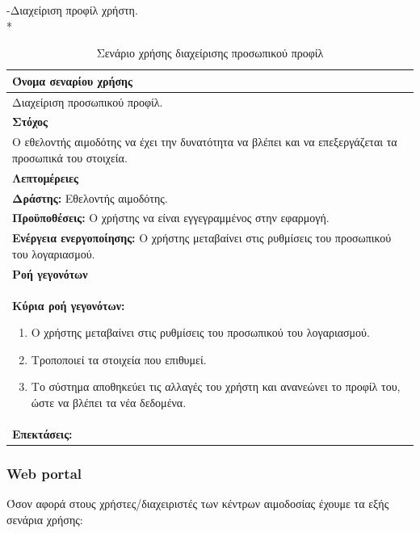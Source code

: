 -Διαχείριση προφίλ χρήστη.
\\*
\begin{table}[H]
	\begin{center}
	    \begin{tabular}{|p{\dimexpr \linewidth-2\tabcolsep}|}
	    \hline
	    \rowcolor{grayy}
	    \textbf{Όνομα σεναρίου χρήσης}
	    \\ \hline    
	    Διαχείριση προσωπικού προφίλ. 
	     \\ \hline
	    \rowcolor{grayy}
	    \textbf{\textbf{Στόχος}}
	    \\ \hline
	 	 Ο εθελοντής αιμοδότης να έχει την δυνατότητα να βλέπει και να επεξεργάζεται τα προσωπικά του στοιχεία.
	    \\ \hline
	    \rowcolor{grayy}
	    \textbf{Λεπτομέρειες}
	    \\ \hline
		\textbf{Δράστης:} Εθελοντής αιμοδότης.
		\\*
		\textbf{Προϋποθέσεις:} Ο χρήστης να είναι εγγεγραμμένος στην εφαρμογή.
		\\*
		\textbf{Ενέργεια ενεργοποίησης:} Ο χρήστης μεταβαίνει στις ρυθμίσεις του προσωπικού του λογαριασμού.
		\\ \hline
		\rowcolor{grayy}    
	    \textbf{Ροή γεγονότων}
	    \\ \hline
		\textbf{Κύρια ροή γεγονότων:}
		\begin{enumerate}
			\item	 Ο χρήστης μεταβαίνει στις ρυθμίσεις του προσωπικού του λογαριασμού.
			\item Τροποποιεί τα στοιχεία που επιθυμεί.
			\item Το σύστημα αποθηκεύει τις αλλαγές του χρήστη και ανανεώνει το προφίλ του, ώστε να βλέπει τα νέα δεδομένα.
		\end{enumerate}
		\\ \hline
		\textbf{Επεκτάσεις:}
		   \\ \hline
	    \end{tabular}
	    \caption{Σενάριο χρήσης διαχείρισης προσωπικού προφίλ}
	    \label{tab:profile_management}
	\end{center}
\end{table}	


 \subsubsection{Web portal}

Όσον αφορά στους χρήστες/διαχειριστές των κέντρων αιμοδοσίας έχουμε τα εξής σενάρια χρήσης:

